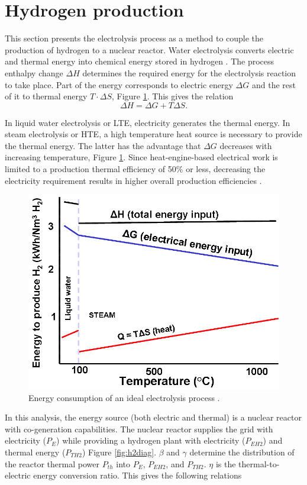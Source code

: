 \documentclass{anstrans}
\begin{document}
\section{Hydrogen production}
\label{section:hydroprod}

This section presents the electrolysis process as a method to couple the production of hydrogen to a nuclear reactor.
Water electrolysis converts electric and thermal energy into chemical energy stored in hydrogen \cite{hi2h2_highly_2007}.
The process enthalpy change $\Delta H$ determines the required energy for the electrolysis reaction to take place.
Part of the energy corresponds to electric energy $\Delta G$ and the rest of it to thermal energy $T \cdot \Delta S$, Figure \ref{fig:electro}.
This gives the relation
\begin{equation}
\Delta H = \Delta G + T \Delta S.
\end{equation}

In liquid water electrolysis or \gls{LTE}, electricity generates the thermal energy.
In steam electrolysis or \gls{HTE}, a high temperature heat source is necessary to provide the thermal energy.
The latter has the advantage that $\Delta G$ decreases with increasing temperature, Figure \ref{fig:electro}.
Since heat-engine-based electrical work is limited to a production thermal efficiency of 50$\%$ or less, decreasing the electricity requirement results in higher overall production efficiencies \cite{j_e_obrien_high_2010}.

\begin{figure}[htbp!]
	\centering
	\includegraphics[width=0.7\linewidth]{figures/ele-heat_curve.png}
	\hfill
	\caption{Energy consumption of an ideal electrolysis process \cite{hi2h2_highly_2007}.}
	\label{fig:electro}
\end{figure}

In this analysis, the energy source (both electric and thermal) is a nuclear reactor with co-generation capabilities.
The nuclear reactor supplies the grid with electricity ($P_E$) while providing a hydrogen plant with electricity ($P_{EH2}$) and thermal energy ($P_{TH2}$) Figure \ref{fig:h2diag}.
$\beta$ and $\gamma$ determine the distribution of the reactor thermal power $P_{th}$ into $P_E$, $P_{EH2}$, and $P_{TH2}$.
$\eta$ is the thermal-to-electric energy conversion ratio.
This gives the following relations
\end{document}
